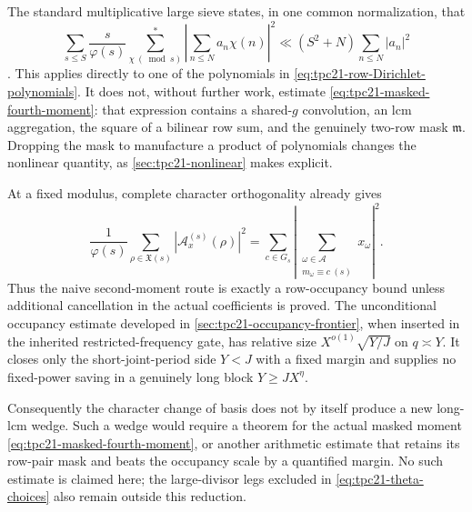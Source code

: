 The standard multiplicative large sieve states, in one common
normalization, that
\begin{equation}
 \sum_{s\leq S}\frac{s}{\varphi(s)}
 \sum_{\chi\ (\bmod s)}^{*}
 \left|\sum_{n\leq N}a_n\chi(n)\right|^2
 \ll (S^2+N)\sum_{n\leq N}|a_n|^2
 \label{eq:tpc21-standard-character-large-sieve}
\end{equation}
\cite[Chapter~7]{IwaniecKowalski2004}.  This applies directly to one
of the polynomials in \eqref{eq:tpc21-row-Dirichlet-polynomials}.  It
does not, without further work, estimate
\eqref{eq:tpc21-masked-fourth-moment}: that expression contains a
shared-\(g\) convolution, an lcm aggregation, the square of a bilinear
row sum, and the genuinely two-row mask \(\mathfrak m\).  Dropping the
mask to manufacture a product of polynomials changes the nonlinear
quantity, as \cref{sec:tpc21-nonlinear} makes explicit.

At a fixed modulus, complete character orthogonality already gives
\begin{equation}
 \frac1{\varphi(s)}
 \sum_{\rho\in\mathfrak X(s)}
 |\mathcal A_x^{(s)}(\rho)|^2
 =\sum_{c\in G_s}
  \left|\sum_{\substack{\omega\in\mathcal A\\m_\omega\equiv c\ (s)}}
  x_\omega\right|^2.
 \label{eq:tpc21-fixed-character-occupancy}
\end{equation}
Thus the naive second-moment route is exactly a row-occupancy bound
unless additional cancellation in the actual coefficients is proved.
The unconditional occupancy estimate developed in
\cref{sec:tpc21-occupancy-frontier}, when inserted in the inherited
restricted-frequency gate, has relative size
\(X^{o(1)}\sqrt{Y/J}\) on \(q\asymp Y\).  It closes only the
short-joint-period side \(Y<J\) with a fixed margin and supplies no
fixed-power saving in a genuinely long block \(Y\geq JX^\eta\).

Consequently the character change of basis does not by itself produce
a new long-lcm wedge.  Such a wedge would require a theorem for the
actual masked moment \eqref{eq:tpc21-masked-fourth-moment}, or another
arithmetic estimate that retains its row-pair mask and beats the
occupancy scale by a quantified margin.  No such estimate is claimed
here; the large-divisor legs excluded in \eqref{eq:tpc21-theta-choices}
also remain outside this reduction.
